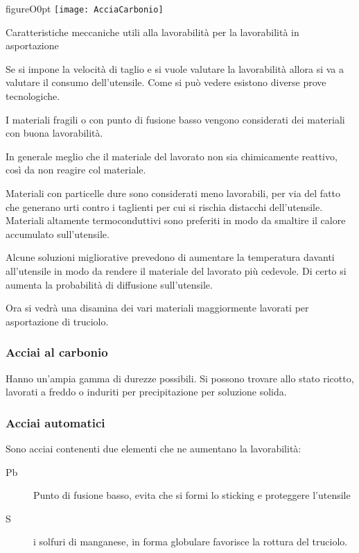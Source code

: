 \begin{wrapfloat}{figure}{O}{0pt}
\texttt{[image: AcciaCarbonio]}
\caption{Caratteristiche meccaniche utili alla lavorabilità per la lavorabilità in asportazione}
\label{fig:AcciaiCarbonio}
\end{wrapfloat}

Se si impone la velocità di taglio e si vuole valutare la lavorabilità allora si va a valutare il consumo dell'utensile.
Come si può vedere esistono diverse prove tecnologiche.

I materiali fragili o con punto di fusione basso vengono considerati dei materiali con buona lavorabilità.

In generale meglio che il materiale del lavorato non sia chimicamente reattivo, così da non reagire col materiale.

Materiali con particelle dure sono considerati meno lavorabili, per via del fatto che generano urti contro i taglienti per cui si rischia distacchi dell'utensile.
Materiali altamente termoconduttivi sono preferiti in modo da smaltire il calore accumulato sull'utensile.

Alcune soluzioni migliorative prevedono di aumentare la temperatura davanti all'utensile in modo da rendere il materiale del lavorato più cedevole.
Di certo si aumenta la probabilità di diffusione sull'utensile.

Ora si vedrà una disamina dei vari materiali maggiormente lavorati per asportazione di truciolo.

\subsubsection{Acciai al carbonio}
Hanno un'ampia gamma di durezze possibili. Si possono trovare allo stato ricotto, lavorati a freddo o induriti per precipitazione per soluzione solida.

\subsubsection{Acciai automatici}
Sono acciai contenenti due elementi che ne aumentano la lavorabilità:
\begin{description}
\item[Pb] Punto di fusione basso, evita che si formi lo sticking e proteggere l'utensile
\item[S] i solfuri di manganese, in forma globulare favorisce la rottura del truciolo.
\end{description}

